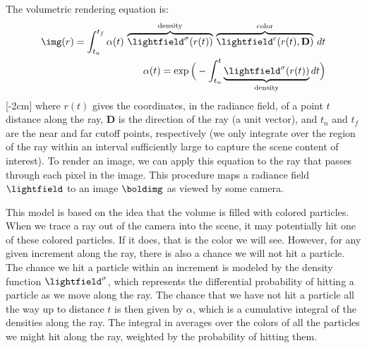 The volumetric rendering equation is:
\begin{align}
    \img(r) = \int_{t_n}^{t_f}\alpha(t) \, \overbrace{\lightfield^\sigma(r(t))}^{\text{density}} \, \overbrace{\lightfield^c(r(t),\mathbf{D})}^{\text{color}} \, dt \label{eqn:nerfs:vol_rendering_integral}\\
    \alpha(t) = \exp \Big(-\int_{t_n}^{t} \underbrace{\lightfield^\sigma(r(t))}_{\text{density}} dt\Big)
\end{align}
[-2cm]
where $r(t)$ gives the coordinates, in the radiance field, of a point $t$ distance along the ray, $\mathbf{D}$ is the direction of the ray (a unit vector), and $t_n$ and $t_f$ are the near and far cutoff points, respectively (we only integrate over the region of the ray within an interval sufficiently large to capture the scene content of interest). To render an image, we can apply this equation to the ray that passes through each pixel in the image. This procedure maps a radiance field $\lightfield$ to an image $\boldimg$ as viewed by some camera.

This model is based on the idea that the volume is filled with colored particles. When we trace a ray out of the camera into the scene, it may potentially hit one of these colored particles. If it does, that is the color we will see. However, for any given increment along the ray, there is also a chance we will not hit a particle. The chance we hit a particle within an increment is modeled by the density function $\lightfield^\sigma$, which represents the differential probability of hitting a particle as we move along the ray. The chance that we have not hit a particle all the way up to distance $t$ is then given by $\alpha$, which is a cumulative integral of the densities along the ray. %
The integral in \eqn{\ref{eqn:nerfs:vol_rendering_integral}} averages over the colors of all the particles we might hit along the ray, weighted by the probability of hitting them.

